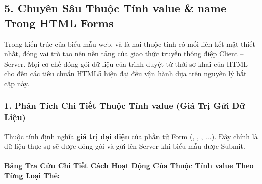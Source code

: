 \subsection{5. Chuyên Sâu Thuộc Tính value \& name Trong HTML Forms}
\label{sec:form_attributes_value_name}

Trong kiến trúc của biểu mẫu web,  và  là hai thuộc tính có mối liên kết mật thiết nhất, đóng vai trò tạo nên nền tảng của giao thức truyền thông điệp Client -- Server. Mọi cơ chế đóng gói dữ liệu của trình duyệt từ thời sơ khai của HTML cho đến các tiêu chuẩn HTML5 hiện đại đều vận hành dựa trên nguyên lý bắt cặp  này.

\subsubsection{1. Phân Tích Chi Tiết Thuộc Tính value (Giá Trị Gửi Dữ Liệu)}

\begin{conceptBox}
Thuộc tính  định nghĩa \textbf{giá trị đại diện} của phần tử Form (, , , ...). Đây chính là dữ liệu thực sự sẽ được đóng gói và gửi lên Server khi biểu mẫu được Submit.
\end{conceptBox}

\paragraph{Bảng Tra Cứu Chi Tiết Cách Hoạt Động Của Thuộc Tính value Theo Từng Loại Thẻ:}

